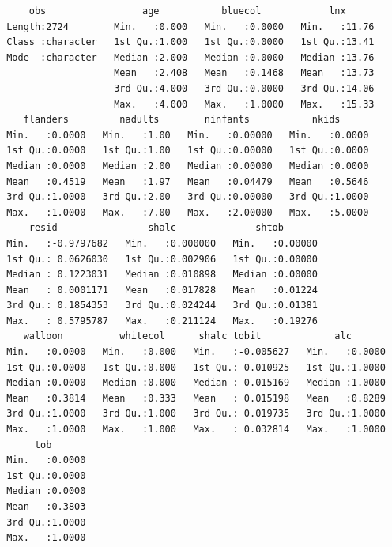 \documentclass[]{book}
\newenvironment{Shaded}{\begin{snugshade}}{\end{snugshade}}
\newcommand{\ControlFlowTok}[1]{\textcolor[rgb]{0.13,0.29,0.53}{\textbf{#1}}}
\newcommand{\DataTypeTok}[1]{\textcolor[rgb]{0.13,0.29,0.53}{#1}}
\newcommand{\DecValTok}[1]{\textcolor[rgb]{0.00,0.00,0.81}{#1}}
\newcommand{\FloatTok}[1]{\textcolor[rgb]{0.00,0.00,0.81}{#1}}
\newcommand{\KeywordTok}[1]{\textcolor[rgb]{0.13,0.29,0.53}{\textbf{#1}}}
\newcommand{\NormalTok}[1]{#1}
\newcommand{\OperatorTok}[1]{\textcolor[rgb]{0.81,0.36,0.00}{\textbf{#1}}}
\newcommand{\StringTok}[1]{\textcolor[rgb]{0.31,0.60,0.02}{#1}}
\begin{document}
\begin{verbatim}
     obs                 age           bluecol            lnx       
 Length:2724        Min.   :0.000   Min.   :0.0000   Min.   :11.76  
 Class :character   1st Qu.:1.000   1st Qu.:0.0000   1st Qu.:13.41  
 Mode  :character   Median :2.000   Median :0.0000   Median :13.76  
                    Mean   :2.408   Mean   :0.1468   Mean   :13.73  
                    3rd Qu.:4.000   3rd Qu.:0.0000   3rd Qu.:14.06  
                    Max.   :4.000   Max.   :1.0000   Max.   :15.33  
    flanders         nadults        ninfants           nkids       
 Min.   :0.0000   Min.   :1.00   Min.   :0.00000   Min.   :0.0000  
 1st Qu.:0.0000   1st Qu.:1.00   1st Qu.:0.00000   1st Qu.:0.0000  
 Median :0.0000   Median :2.00   Median :0.00000   Median :0.0000  
 Mean   :0.4519   Mean   :1.97   Mean   :0.04479   Mean   :0.5646  
 3rd Qu.:1.0000   3rd Qu.:2.00   3rd Qu.:0.00000   3rd Qu.:1.0000  
 Max.   :1.0000   Max.   :7.00   Max.   :2.00000   Max.   :5.0000  
     resid                shalc              shtob        
 Min.   :-0.9797682   Min.   :0.000000   Min.   :0.00000  
 1st Qu.: 0.0626030   1st Qu.:0.002906   1st Qu.:0.00000  
 Median : 0.1223031   Median :0.010898   Median :0.00000  
 Mean   : 0.0001171   Mean   :0.017828   Mean   :0.01224  
 3rd Qu.: 0.1854353   3rd Qu.:0.024244   3rd Qu.:0.01381  
 Max.   : 0.5795787   Max.   :0.211124   Max.   :0.19276  
    walloon          whitecol      shalc_tobit             alc        
 Min.   :0.0000   Min.   :0.000   Min.   :-0.005627   Min.   :0.0000  
 1st Qu.:0.0000   1st Qu.:0.000   1st Qu.: 0.010925   1st Qu.:1.0000  
 Median :0.0000   Median :0.000   Median : 0.015169   Median :1.0000  
 Mean   :0.3814   Mean   :0.333   Mean   : 0.015198   Mean   :0.8289  
 3rd Qu.:1.0000   3rd Qu.:1.000   3rd Qu.: 0.019735   3rd Qu.:1.0000  
 Max.   :1.0000   Max.   :1.000   Max.   : 0.032814   Max.   :1.0000  
      tob        
 Min.   :0.0000  
 1st Qu.:0.0000  
 Median :0.0000  
 Mean   :0.3803  
 3rd Qu.:1.0000  
 Max.   :1.0000  
\end{verbatim}

\begin{Shaded}
\end{Shaded}
\end{document}
